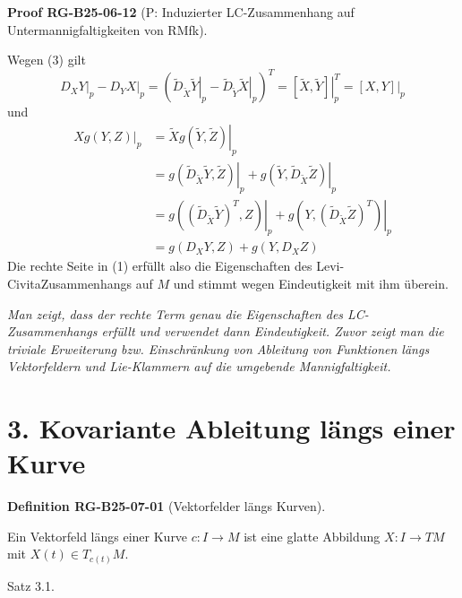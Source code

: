 \documentclass[10pt, letterpaper]{article}
\newenvironment{note}{\par\begingroup\color{hellblau}\itshape}{\par\endgroup}
\newcommand{\CustomHeading}[3]{%
  \par\medskip\noindent%
  \textbf{#1 #2} \textnormal{(#3)}.\enskip%
}
\newenvironment{DEF}[2]{\begin{unitbox}\CustomHeading{Definition}{#1}{#2}}{\end{unitbox}}
\newenvironment{PROOF}[2]{\begin{unitbox}\CustomHeading{Proof}{#1}{#2}}{\end{unitbox}}
\begin{document}
\begin{PROOF}{RG-B25-06-12}{P: Induzierter LC-Zusammenhang auf Untermannigfaltigkeiten von RMfk}
$$$$
Wegen (3) gilt
$$\left.D_{X} Y\right|_{p} - \left.D_{Y} X\right|_{p}
= \left(\left.\tilde{D}_{\tilde{X}} \tilde{Y}\right|_{p} - \left.\tilde{D}_{\tilde{Y}} \tilde{X}\right|_{p}\right)^{T}
= \left.[\tilde{X}, \tilde{Y}]\right|_{p}^{T}
= \left.[X, Y]\right|_{p}$$
und
$$
\begin{aligned}
\left.X g(Y, Z)\right|_{p} & =\left.\tilde{X} g(\tilde{Y}, \tilde{Z})\right|_{p} \\
& =\left.g\left(\tilde{D}_{\tilde{X}} \tilde{Y}, \tilde{Z}\right)\right|_{p}+\left.g\left(\tilde{Y}, \tilde{D}_{\tilde{X}} \tilde{Z}\right)\right|_{p} \\
& =\left.g\left(\left(\tilde{D}_{\tilde{X}} \tilde{Y}\right)^{T}, Z\right)\right|_{p}+\left.g\left(Y,\left(\tilde{D}_{\tilde{X}} \tilde{Z}\right)^{T}\right)\right|_{p} \\
& =g\left(D_{X} Y, Z\right)+g\left(Y, D_{X} Z\right)
\end{aligned}
$$
Die rechte Seite in (1) erfüllt also die Eigenschaften des Levi-CivitaZusammenhangs auf $M$ und stimmt wegen Eindeutigkeit mit ihm überein.
\begin{note}
  Man zeigt, dass der rechte Term genau die Eigenschaften des LC-Zusammenhangs erfüllt und verwendet dann Eindeutigkeit. Zuvor zeigt man die triviale Erweiterung bzw. Einschränkung von Ableitung von Funktionen längs Vektorfeldern und Lie-Klammern auf die umgebende Mannigfaltigkeit.
\end{note}
\end{PROOF}





\pagebreak


\section*{3. Kovariante Ableitung längs einer Kurve}


\begin{DEF}{RG-B25-07-01}{Vektorfelder längs Kurven}
Ein Vektorfeld längs einer Kurve $c: I \rightarrow M$ ist eine glatte Abbildung $X: I \rightarrow T M$ mit $X(t) \in T_{c(t)} M$.
\end{DEF}


Satz 3.1. 
\end{document}
